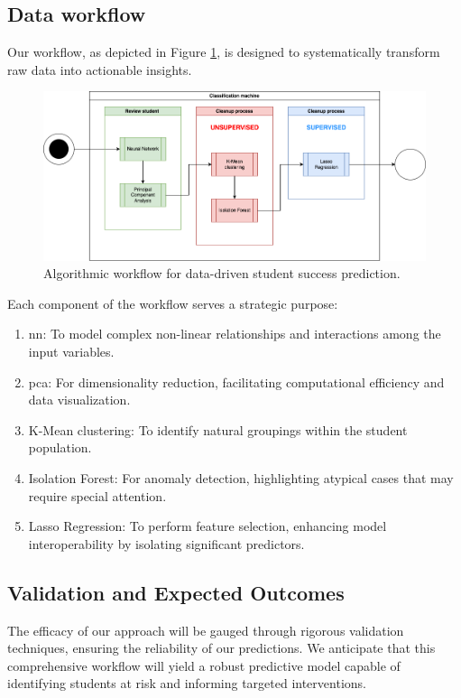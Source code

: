 \documentclass[../main.tex]{subfiles}
\begin{document}
\subsection{Data workflow}
\label{subsec:conceptualimplementation_dataworkflow}

Our workflow, as depicted in Figure \ref{fig:dataworkflow}, is designed to systematically transform raw data into actionable insights.

\begin{figure}
    \centering
    \includegraphics[width=1\linewidth]{res//diagram/ML Workflow.png}
    \caption{Algorithmic workflow for data-driven student success prediction.}
    \label{fig:dataworkflow}
\end{figure}

Each component of the workflow serves a strategic purpose:

\begin{enumerate}
    \item \acrfull{nn}: To model complex non-linear relationships and interactions among the input variables.
    \item \acrfull{pca}: For dimensionality reduction, facilitating computational efficiency and data visualization.
    \item K-Mean clustering: To identify natural groupings within the student population.
    \item Isolation Forest: For anomaly detection, highlighting atypical cases that may require special attention.
    \item Lasso Regression: To perform feature selection, enhancing model interoperability by isolating significant predictors.
\end{enumerate}

\subsection{Validation and Expected Outcomes}
The efficacy of our approach will be gauged through rigorous validation techniques, ensuring the reliability of our predictions. We anticipate that this comprehensive workflow will yield a robust predictive model capable of identifying students at risk and informing targeted interventions.
\end{document}
